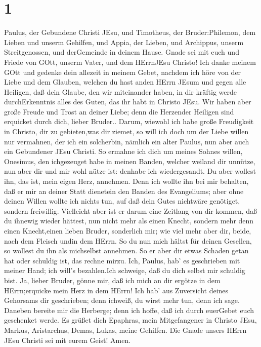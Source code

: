 \hypertarget{section}{%
\section{1}\label{section}}

 Paulus, der Gebundene Christi JEsu, und Timotheus, der
Bruder:Philemon, dem Lieben und unserm Gehilfen,  und Appia,
der Lieben, und Archippus, unserm Streitgenossen, und derGemeinde in
deinem Hause.  Gnade sei mit euch und Friede von GOtt,
unserm Vater, und dem HErrnJEsu Christo!  Ich danke meinem
GOtt und gedenke dein allezeit in meinem Gebet,  nachdem ich
höre von der Liebe und dem Glauben, welchen du hast anden HErrn JEsum
und gegen alle Heiligen,  daß dein Glaube, den wir
miteinander haben, in dir kräftig werde durchErkenntnis alles des Guten,
das ihr habt in Christo JEsu.  Wir haben aber große Freude
und Trost an deiner Liebe; denn die Herzender Heiligen sind erquicket
durch dich, lieber Bruder..  Darum, wiewohl ich habe große
Freudigkeit in Christo, dir zu gebieten,was dir ziemet,  so
will ich doch um der Liebe willen nur vermahnen, der ich ein solcherbin,
nämlich ein alter Paulus, nun aber auch ein Gebundener JEsu Christi.
 So ermahne ich dich um meines Sohnes willen, Onesimus, den
ichgezeuget habe in meinen Banden,  welcher weiland dir
unnütze, nun aber dir und mir wohl nütze ist: denhabe ich wiedergesandt.
 Du aber wollest ihn, das ist, mein eigen Herz, annehmen.
 Denn ich wollte ihn bei mir behalten, daß er mir an deiner
Statt dienetein den Banden des Evangeliums;  aber ohne
deinen Willen wollte ich nichts tun, auf daß dein Gutes nichtwäre
genötiget, sondern freiwillig.  Vielleicht aber ist er
darum eine Zeitlang von dir kommen, daß du ihnewig wieder hättest,
 nun nicht mehr als einen Knecht, sondern mehr denn einen
Knecht,einen lieben Bruder, sonderlich mir; wie viel mehr aber dir,
beide, nach dem Fleisch undin dem HErrn.  So du nun mich
hältst für deinen Gesellen, so wollest du ihn als michselbst annehmen.
 So er aber dir etwas Schaden getan hat oder schuldig ist,
das rechne mirzu.  Ich, Paulus, hab' es geschrieben mit
meiner Hand; ich will's bezahlen.Ich schweige, daß du dich selbst mir
schuldig bist.  Ja, lieber Bruder, gönne mir, daß ich mich
an dir ergötze in dem HErrn;erquicke mein Herz in dem HErrn!
 Ich hab' aus Zuversicht deines Gehorsams dir geschrieben;
denn ichweiß, du wirst mehr tun, denn ich sage.  Daneben
bereite mir die Herberge; denn ich hoffe, daß ich durch euerGebet euch
geschenket werde.  Es grüßet dich Epaphras, mein
Mitgefangener in Christo JEsu,  Markus, Aristarchus, Demas,
Lukas, meine Gehilfen.  Die Gnade unsers HErrn JEsu Christi
sei mit eurem Geist! Amen.
